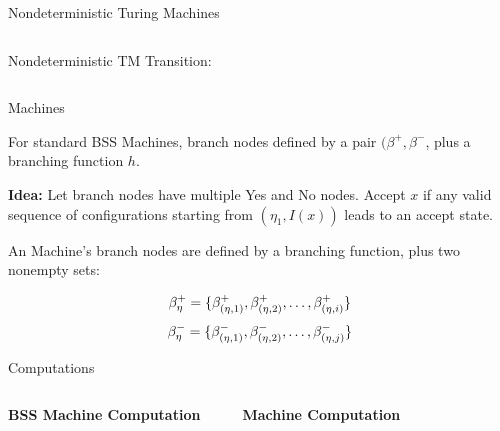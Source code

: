 \documentclass[c]{beamer}
\begin{document}
\begin{frame}{Nondeterministic Turing Machines}

  \begin{columns}

    Nondeterministic TM Transition:
       

    \begin{center}
      \scaletopagewidth{\ndetercomptm{}}
    \end{center}
  \end{columns}
\end{frame}

\begin{frame}{\ndet Machines}

  For standard BSS Machines, branch nodes defined by a pair
  $(\beta^+, \beta^-$, plus a branching function $h$.\pause

  \vspace{\baselineskip}

  \textbf{Idea:} Let branch nodes have multiple Yes and No nodes.
  Accept $x$ if any valid sequence of configurations starting from
  $(\eta_1, I(x))$ leads to an accept state.\pause
  
  \vspace{\baselineskip}

  An \ndet Machine's branch nodes are defined by a branching function,
  plus two nonempty sets:

  $$\beta^+_\eta = \{\beta_{(\eta, 1)}^+, \beta_{(\eta, 2)}^+, \ldots, \beta_{(\eta, i)}^+\}$$
  $$\beta_\eta^- = \{\beta_{(\eta, 1)}^-, \beta_{(\eta, 2)}^-, \ldots, \beta_{(\eta, j)}^-\}$$
\end{frame}

\begin{frame}{\ndet Computations}
  
  \begin{columns}
    
    \textbf{BSS Machine Computation}
    \begin{center}
      \detercompbss{}
    \end{center}
    \textbf{\ndet Machine Computation}
    \begin{center}
      \scaletopagewidth{\ndetercompbss{}}
    \end{center}
  \end{columns}

\end{frame}
\end{document}
